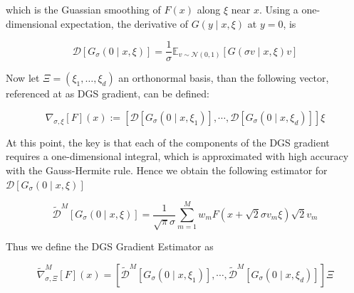 which is the Guassian smoothing of $F(x)$ along $\xi$ near $x$. Using a one-dimensional expectation, the derivative of $G(y \mid x, \xi)$ at $y=0$, is 

\begin{equation}\label{DerivativeSmoothingSection}
 \mathcal{D}\left[G_{\sigma}(0 \mid x, \xi)\right]=\frac{1}{\sigma} \mathbb{E}_{v \sim \mathcal{N}(0,1)}[G(\sigma v \mid x, \xi) v] 
\end{equation}

Now let $\Xi = \left(\xi_1,\dots,\xi_d\right)$ an orthonormal basis, than the following vector, referenced at as DGS gradient, can be defined:

\begin{defn}\label{DGSGradient}

	\begin{equation}
		\nabla_{\sigma, \xi}[F](x):=\left[\mathcal{D}\left[G_{\sigma}\left(0 \mid x, \xi_{1}\right)\right], \cdots, \mathcal{D}\left[G_{\sigma}\left(0 \mid x, \xi_{d}\right)\right]\right] \xi 
	\end{equation}

\end{defn}

At this point, the key is that each of the components of the DGS gradient requires a one-dimensional integral, which is approximated with high accuracy with the Gauss-Hermite rule. Hence we obtain the following estimator for $\mathcal{D}\left[G_{\sigma}(0 \mid x, \xi)\right]$

\begin{equation}\label{GHApproximationSmothedSection}
	\tilde{\mathcal{D}}^{M}\left[G_{\sigma}(0 \mid x, \xi)\right]=\frac{1}{\sqrt{\pi} \sigma} \sum_{m=1}^{M} w_{m} F\left(x+\sqrt{2} \sigma v_{m} \xi\right) \sqrt{2} v_{m} 
\end{equation}

Thus we define the DGS Gradient Estimator as 

\begin{defn}\label{DGSGradientEstimator}

	\begin{equation}\label{DGSGradientEstimatorEq}
		\widetilde{\nabla}_{\sigma, \Xi}^{M}[F](x)=\left[\widetilde{\mathcal{D}}^{M}\left[G_{\sigma}\left(0 \mid x, \xi_{1}\right)\right], \cdots, \widetilde{\mathcal{D}}^{M}\left[G_{\sigma}\left(0 \mid x, \xi_{d}\right)\right]\right] \Xi 
	\end{equation}

\end{defn}

